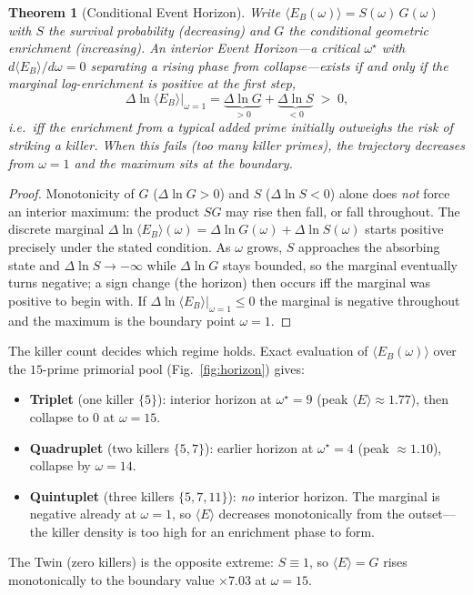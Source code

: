 \documentclass[11pt,a4paper]{article}
\newtheorem{theorem}{Theorem}
\begin{document}
\begin{theorem}[Conditional Event Horizon]
Write $\langle E_B(\omega)\rangle=S(\omega)\,G(\omega)$ with $S$ the survival
probability (decreasing) and $G$ the conditional geometric enrichment
(increasing). An \emph{interior} Event Horizon---a critical $\omega^\star$ with
$d\langle E_B\rangle/d\omega=0$ separating a rising phase from collapse---exists if
and only if the marginal log-enrichment is positive at the first step,
\[
  \Delta\ln\langle E_B\rangle\big|_{\omega=1}
  =\underbrace{\Delta\ln G}_{>0}+\underbrace{\Delta\ln S}_{<0}\;>\;0,
\]
i.e.\ iff the enrichment from a typical added prime initially outweighs the risk
of striking a killer. When this fails (too many killer primes), the trajectory
decreases from $\omega=1$ and the maximum sits at the boundary.
\end{theorem}

\begin{proof}
Monotonicity of $G$ ($\Delta\ln G>0$) and $S$ ($\Delta\ln S<0$) alone does
\emph{not} force an interior maximum: the product $SG$ may rise then fall, or fall
throughout. The discrete marginal $\Delta\ln\langle E_B\rangle(\omega)=\Delta\ln
G(\omega)+\Delta\ln S(\omega)$ starts positive precisely under the stated
condition. As $\omega$ grows, $S$ approaches the absorbing state and $\Delta\ln S
\to-\infty$ while $\Delta\ln G$ stays bounded, so the marginal eventually turns
negative; a sign change (the horizon) then occurs iff the marginal was positive to
begin with. If $\Delta\ln\langle E_B\rangle|_{\omega=1}\le0$ the marginal is
negative throughout and the maximum is the boundary point $\omega=1$.
\end{proof}

The killer count decides which regime holds. Exact evaluation of
$\langle E_B(\omega)\rangle$ over the $15$-prime primorial pool
(Fig.~\ref{fig:horizon}) gives:
\begin{itemize}
\item \textbf{Triplet} (one killer $\{5\}$): interior horizon at $\omega^\star=9$
  (peak $\langle E\rangle\approx1.77$), then collapse to $0$ at $\omega=15$.
\item \textbf{Quadruplet} (two killers $\{5,7\}$): earlier horizon at
  $\omega^\star=4$ (peak $\approx1.10$), collapse by $\omega=14$.
\item \textbf{Quintuplet} (three killers $\{5,7,11\}$): \emph{no} interior horizon.
  The marginal is negative already at $\omega=1$, so $\langle E\rangle$ decreases
  monotonically from the outset---the killer density is too high for an enrichment
  phase to form.
\end{itemize}
The Twin (zero killers) is the opposite extreme: $S\equiv1$, so $\langle E\rangle=G$
rises monotonically to the boundary value $\times7.03$ at $\omega=15$.
\end{document}
